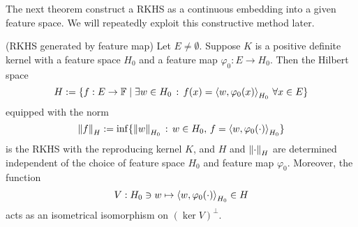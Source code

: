 \documentclass[a4paper,12pt]{article}
\begin{document}
The next theorem construct a RKHS as a continuous embedding into a given feature space. We will repeatedly exploit this constructive method later.
\begin{thm} (RKHS generated by feature map)\label{rkhs generated by feature map}
	Let \( E \neq \emptyset \). Suppose \( K \) is a positive definite kernel with a feature space \( H_0 \) and a feature map \( \varphi_0 :E \to H_0 \). Then the Hilbert space
	\begin{equation*}
		H:= \{f:E \to \mathbb{F} \mid \exists w \in H_0 \,:\, f(x)=\left<w, \varphi_0(x) \right>_{H_0}\, \forall x \in E \}
	\end{equation*}
	equipped with the norm
	\begin{equation}\label{norm defined by feature map}
		\left\| f \right\|_H := \inf \{\left\| w \right\|_{H_0} \,:\, w \in H_0,\, f = \left<w, \varphi_0(\cdot ) \right>_{H_0}\}
	\end{equation}
	is the RKHS with the reproducing kernel \( K \), and \( H \) and \( \left\| \cdot  \right\|_H \) are determined independent of the choice of feature space \( H_0 \) and feature map \( \varphi_0 \). Moreover, the function
	\begin{equation*}
		V : H_0 \ni w \mapsto \left<w, \varphi_0(\cdot ) \right>_{H_0} \in H
	\end{equation*}
	acts as an isometrical isomorphism on \( (\ker V)^{\perp} \).
\end{thm}
\end{document}

